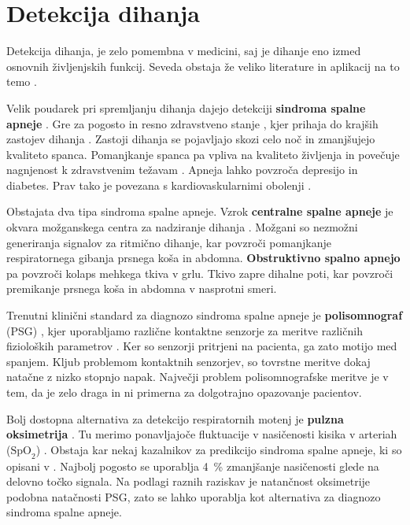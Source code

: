 \section{Detekcija dihanja}\label{sec:detekcija-dihanja}
Detekcija dihanja, je zelo pomembna v medicini, saj je dihanje eno izmed osnovnih življenjskih funkcij. Seveda obstaja že veliko literature in aplikacij na to temo \cite{sathyanarayana2015vision}.

Velik poudarek pri spremljanju dihanja dajejo detekciji  \textbf{sindroma spalne apneje} \cite{sathyanarayana2015vision}. Gre za pogosto in resno zdravstveno stanje \cite{wang2006vision}, kjer prihaja do krajših zastojev dihanja \cite{flemons2002obstructive}. Zastoji dihanja se pojavljajo skozi celo noč in zmanjšujejo kvaliteto spanca. Pomanjkanje spanca pa vpliva na kvaliteto življenja in povečuje nagnjenost k zdravstvenim težavam \cite{malhotra2002obstructive}. Apneja lahko povzroča depresijo in diabetes. Prav tako je povezana s kardiovaskularnimi obolenji \cite{takemura2005respiratory}.

Obstajata dva tipa sindroma spalne apneje. Vzrok \textbf{centralne spalne apneje} je okvara možganskega centra za nadziranje dihanja \cite{javaheri2010central}. Možgani so nezmožni generiranja signalov za ritmično dihanje, kar povzroči pomanjkanje respiratornega gibanja prsnega koša in abdomna. \textbf{Obstruktivno spalno apnejo} pa povzroči kolaps mehkega tkiva v grlu. Tkivo zapre dihalne poti, kar povzroči premikanje prsnega koša in abdomna v nasprotni smeri.

Trenutni klinični standard za diagnozo sindroma spalne apneje je \textbf{polisomnograf} (PSG) \cite{collop2007clinical}, kjer uporabljamo različne kontaktne senzorje za meritve različnih fizioloških parametrov \cite{heinrich2015video}. Ker so senzorji pritrjeni na pacienta, ga zato motijo med spanjem. Kljub problemom kontaktnih senzorjev, so tovrstne meritve dokaj natačne z nizko stopnjo napak. Največji problem polisomnografske meritve je v tem, da je zelo draga in ni primerna za dolgotrajno opazovanje pacientov.

Bolj dostopna alternativa za detekcijo respiratornih motenj je \textbf{pulzna oksimetrija} \cite{netzer2001overnight}. Tu merimo ponavljajoče fluktuacije v nasičenosti kisika v arteriah ($\mathrm{SpO}_{2}$) \cite{levy1996accuracy}. Obstaja kar nekaj kazalnikov za predikcijo sindroma spalne apneje, ki so opisani v \cite{netzer2001overnight, magalang2003prediction}. Najbolj pogosto se uporablja \SI{4}{\%} zmanjšanje nasičenosti glede na delovno točko signala. Na podlagi raznih raziskav \cite{cooper1991value,magalang2003prediction,netzer2001overnight,levy1996accuracy} je natančnost oksimetrije podobna natačnosti PSG, zato se lahko uporablja kot alternativa za diagnozo sindroma spalne apneje.

